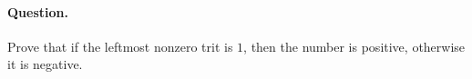 \paragraph{Question.} Prove that if the leftmost nonzero
  trit is \(1\), then the number is positive, otherwise it is
  negative.
